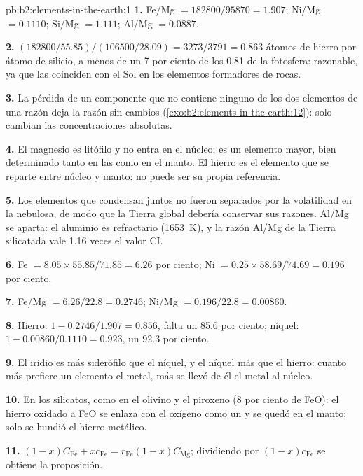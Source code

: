 \begin{solution}{pb:b2:elements-in-the-earth:1}
\textbf{1.} Fe/Mg $= \num{182800}/\num{95870} = 1.907$; Ni/Mg $= 0.1110$; Si/Mg $=
1.111$; Al/Mg $= 0.0887$.

\textbf{2.} $(\num{182800}/55.85)/(\num{106500}/28.09) = 3273/3791 = 0.863$ átomos de hierro por
átomo de silicio, a menos de un 7 por ciento de los 0.81 de la fotosfera: razonable, ya que las 
coinciden con el Sol en los elementos formadores de rocas.

\textbf{3.} La pérdida de un componente que no contiene ninguno de los dos elementos de una razón deja la
razón sin cambios (\cref{exo:b2:elements-in-the-earth:12}): solo cambian las concentraciones absolutas.

\textbf{4.} El magnesio es litófilo y no entra en el núcleo; es un elemento mayor,
bien determinado tanto en las  como en el manto. El hierro es el elemento que se reparte
entre núcleo y manto: no puede ser su propia referencia.

\textbf{5.} Los elementos que condensan juntos no fueron separados por la volatilidad en la
nebulosa, de modo que la Tierra global debería conservar sus razones. Al/Mg se aparta: el aluminio es
refractario (\qty{1653}{K}), y la razón Al/Mg de la Tierra silicatada vale 1.16 veces el valor CI.

\textbf{6.} Fe $= 8.05\times55.85/71.85 = 6.26$ por ciento; Ni $= 0.25\times58.69/74.69 =
0.196$ por ciento.

\textbf{7.} Fe/Mg $= 6.26/22.8 = 0.2746$; Ni/Mg $= 0.196/22.8 = 0.00860$.

\textbf{8.} Hierro: $1 - 0.2746/1.907 = 0.856$, falta un 85.6 por ciento; níquel:
$1 - 0.00860/0.1110 = 0.923$, un 92.3 por ciento.

\textbf{9.} El iridio es más siderófilo que el níquel, y el níquel más que el hierro:
cuanto más prefiere un elemento el metal, más se llevó de él el metal al núcleo.

\textbf{10.} En los silicatos, como  en el olivino y el piroxeno (8 por ciento de FeO):
el hierro oxidado a FeO se enlaza con el oxígeno como un  y se quedó en el
manto; solo se hundió el hierro metálico.

\textbf{11.} $(1-x)C_{\mathrm{Fe}} + xc_{\mathrm{Fe}} = r_{\mathrm{Fe}}(1-x)C_{\mathrm{Mg}}$;
dividiendo por $(1-x)c_{\mathrm{Fe}}$ se obtiene la proposición.


\end{solution}
